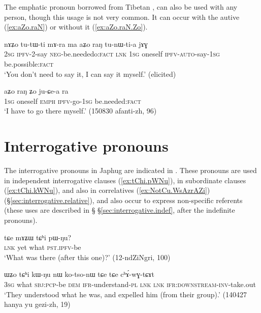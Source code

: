 The emphatic pronoun  borrowed from Tibetan , can also be used with any person, though this usage is not very common. It can occur with the autive (\ref{ex:aZo.raN}) or without it (\ref{ex:aZo.raN.Zo}).

\begin{exe}
\ex \label{ex:aZo.raN}
\gll
nɤʑo tu-tɯ-ti mɤ-ra ma aʑo raŋ tu-nɯ-ti-a jɤɣ \\
\textsc{2sg} \textsc{ipfv}-2-say \textsc{neg}-be.neededo:\textsc{fact} \textsc{lnk} \textsc{1sg} oneself \textsc{ipfv}-\textsc{auto}-say-\textsc{1sg} be.possible:\textsc{fact} \\
\glt `You don't need to say it, I can say it myself.' (elicited)
\end{exe}

\begin{exe}
\ex \label{ex:aZo.raN.Zo}
\gll aʑo raŋ ʑo ju-ɕe-a ra \\
\textsc{1sg} oneself \textsc{emph} \textsc{ipfv}-go-\textsc{1sg} be.needed:\textsc{fact} \\
\glt `I have to go there myself.' (150830 afanti-zh, 96)
\end{exe}

\section{Interrogative pronouns} \label{sec:interrogative.pronouns}
The interrogative pronouns in Japhug are indicated in . These pronouns are used in independent interrogative clauses (\ref{ex:tChi.pWNu}), in subordinate clauses (\ref{ex:tChi.kWNu}), and also in correlatives (\ref{ex:NotCu.WsAzrAZi}) (§\ref{sec:interrogative.relative}), and also occur to express non-specific referents (these uses are described in § §\ref{sec:interrogative.indef}, after the indefinite pronouns).

\begin{exe}
\ex \label{ex:tChi.pWNu}
\gll
tɕe mɤʑɯ tɕʰi pɯ-ŋu? \\
\textsc{lnk} yet what \textsc{pst}.\textsc{ipfv}-be \\
\glt `What was there (after this one)?' (12-ndZiNgri, 100)
\end{exe}  

\begin{exe}
\ex \label{ex:tChi.kWNu}
\gll ɯʑo tɕʰi kɯ-ŋu nɯ ko-tso-nɯ tɕe tɕe cʰɤ́-wɣ-tɕɤt \\
\textsc{3sg} what \textsc{sbj}:\textsc{pcp}-be \textsc{dem} \textsc{ifr}-understand-\textsc{pl} \textsc{lnk} \textsc{lnk} \textsc{ifr}:\textsc{downstream}-\textsc{inv}-take.out \\
\glt `They understood what he was, and expelled him (from their group).' (140427 hanya yu gezi-zh, 19)
\end{exe}  

